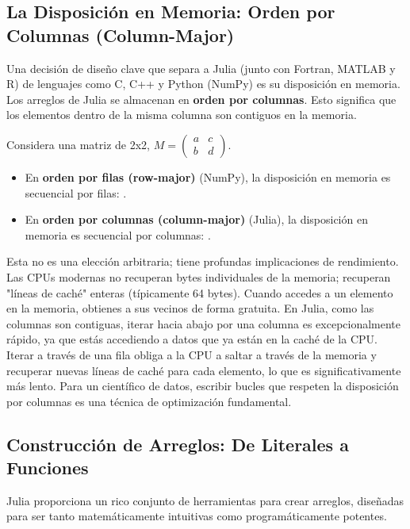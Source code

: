 \subsection*{La Disposición en Memoria: Orden por Columnas (Column-Major)}
Una decisión de diseño clave que separa a Julia (junto con Fortran, MATLAB y R) de lenguajes como C, C++ y Python (NumPy) es su disposición en memoria. Los arreglos de Julia se almacenan en \textbf{orden por columnas}. Esto significa que los elementos dentro de la misma columna son contiguos en la memoria.

Considera una matriz de 2x2, $M = \begin{pmatrix} a & c \\ b & d \end{pmatrix}$.
\begin{itemize}
    \item En \textbf{orden por filas (row-major)} (NumPy), la disposición en memoria es secuencial por filas: \code{[a, c, b, d]}.
    \item En \textbf{orden por columnas (column-major)} (Julia), la disposición en memoria es secuencial por columnas: \code{[a, b, c, d]}.
\end{itemize}

\begin{remark}
Esta no es una elección arbitraria; tiene profundas implicaciones de rendimiento. Las CPUs modernas no recuperan bytes individuales de la memoria; recuperan "líneas de caché" enteras (típicamente 64 bytes). Cuando accedes a un elemento en la memoria, obtienes a sus vecinos de forma gratuita. En Julia, como las columnas son contiguas, iterar hacia abajo por una columna es excepcionalmente rápido, ya que estás accediendo a datos que ya están en la caché de la CPU. Iterar a través de una fila obliga a la CPU a saltar a través de la memoria y recuperar nuevas líneas de caché para cada elemento, lo que es significativamente más lento. Para un científico de datos, escribir bucles que respeten la disposición por columnas es una técnica de optimización fundamental.
\end{remark}

\subsection*{Construcción de Arreglos: De Literales a Funciones}
Julia proporciona un rico conjunto de herramientas para crear arreglos, diseñadas para ser tanto matemáticamente intuitivas como programáticamente potentes.

